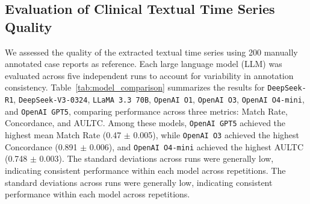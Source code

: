 \subsection{Evaluation of Clinical Textual Time Series Quality}

We assessed the quality of the extracted textual time series using 200 manually annotated case reports as reference. 
Each large language model (LLM) was evaluated across five independent runs to account for variability in annotation consistency. 
Table~\ref{tab:model_comparison} summarizes the results for \texttt{DeepSeek-R1}, \texttt{DeepSeek-V3-0324}, \texttt{LLaMA 3.3 70B}, \texttt{OpenAI O1}, \texttt{OpenAI O3}, \texttt{OpenAI O4-mini}, and \texttt{OpenAI GPT5}, comparing performance across three metrics: Match Rate, Concordance, and AULTC. 
Among these models, \texttt{OpenAI GPT5} achieved the highest mean Match Rate (0.47 $\pm$ 0.005), while \texttt{OpenAI O3} achieved the highest Concordance (0.891 $\pm$ 0.006), and \texttt{OpenAI O4-mini} achieved the highest AULTC (0.748 $\pm$ 0.003). 
The standard deviations across runs were generally low, indicating consistent performance within each model across repetitions.
The standard deviations across runs were generally low, indicating consistent performance within each model across repetitions.


